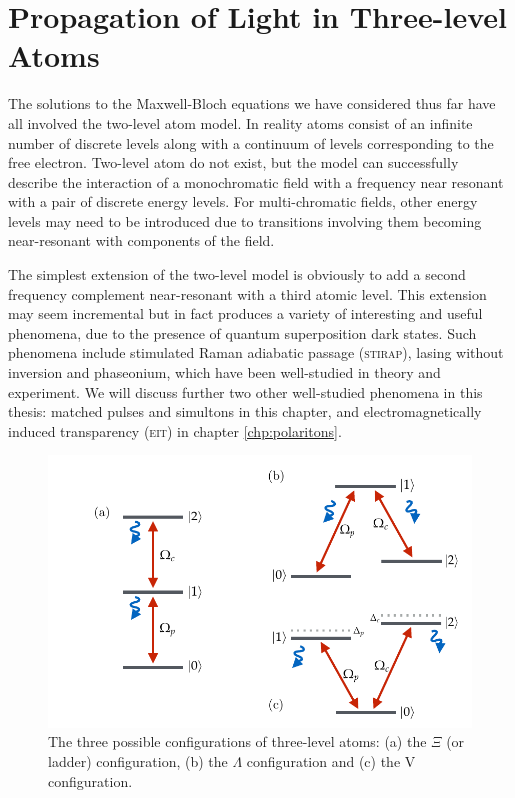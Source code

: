 \section{Propagation of Light in Three-level Atoms}
  \label{sec:nonlinear_threelevel}

    The solutions to the Maxwell-Bloch equations we have considered thus far
    have all involved the two-level atom model. In reality atoms consist of an
    infinite number of discrete levels along with a continuum of levels
    corresponding to the free electron. Two-level atom do not exist, but the
    model can successfully describe the interaction of a monochromatic field
    with a frequency near resonant with a pair of discrete energy levels. For
    multi-chromatic fields, other energy levels may need to be introduced due to
    transitions involving them becoming near-resonant with components of the
    field.

    The simplest extension of the two-level model is obviously to add a second
    frequency complement near-resonant with a third atomic level. This extension
    may seem incremental but in fact produces a variety of interesting and
    useful phenomena, due to the presence of quantum superposition dark states.
    Such phenomena include stimulated Raman adiabatic passage
    (\textsc{stirap})\cite{Grigoryan2001,Unanyan1998}, lasing without
    inversion\cite{Blok1990,Imamoglu1989,Scully1989} and
    phaseonium\cite{Scully1991,Eberly1996}, which have been well-studied in
    theory and experiment. We will discuss further two other well-studied
    phenomena in this thesis: matched pulses and simultons in this chapter, and
    electromagnetically induced transparency (\textsc{eit}) in chapter
    \ref{chp:polaritons}.

    \begin{figure}[]
      \includegraphics[width=\linewidth]
        {figs/03_nonlinear/three_level_diagrams_2.pdf}
      \caption{
      The three possible configurations of three-level atoms: (a) the $\Xi$ (or
      ladder) configuration, (b) the $\Lambda$ configuration and (c) the V
      configuration.
      }
      \label{fig:three_level_diagrams}
    \end{figure}


